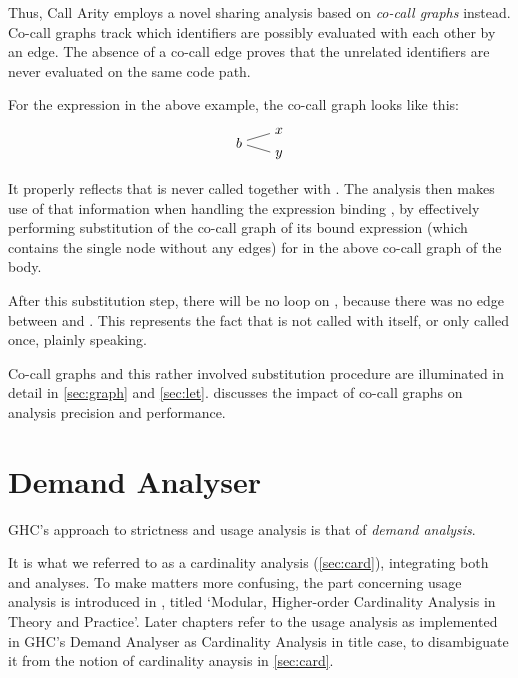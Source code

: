 Thus, Call Arity employs a novel sharing analysis based on \emph{co-call graphs} instead.
Co-call graphs track which identifiers are possibly evaluated with each other by an edge.
The absence of a co-call edge proves that the unrelated identifiers are never evaluated on the same code path.

For the  expression in the above example, the co-call graph looks like this:
\[  
  \begin{tikzpicture}[baseline={(0.base)}]
    \node (0) {$b$};
    \node at (1,0.3) (1) {$x$};
    \node at (1,-0.3) (2) {$y$};
    \draw (0) -- (1);
    \draw (0) -- (2);
  \end{tikzpicture}
\]

It properly reflects that  is never called together with .
The analysis then makes use of that information when handling the  expression binding , by effectively performing substitution of the co-call graph of its bound expression (which contains the single node  without any edges) for  in the above co-call graph of the body.

After this substitution step, there will be no loop on , because there was no edge between  and .
This represents the fact that  is not called with itself, or only called once, plainly speaking.

Co-call graphs and this rather involved substitution procedure are illuminated in detail in \cref{sec:graph} and \cref{sec:let}.
 discusses the impact of co-call graphs on analysis precision and performance.

\section{Demand Analyser}\label{sec:dmd}

GHC's approach to strictness and usage analysis is that of \emph{demand analysis}.

It is what we referred to as a cardinality analysis (\cref{sec:card}), integrating both \MinCard and \MaxCard analyses.
To make matters more confusing, the part concerning usage analysis is introduced in \textcite{card}, titled `Modular, Higher-order Cardinality Analysis in Theory and Practice'.
Later chapters refer to the usage analysis as implemented in GHC's Demand Analyser as Cardinality Analysis in title case, to disambiguate it from the notion of cardinality anaysis in \cref{sec:card}.

